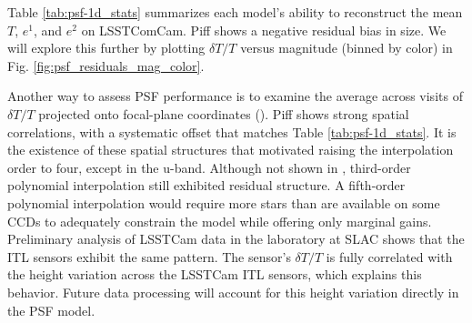 Table \ref{tab:psf-1d_stats} summarizes each model’s ability to reconstruct
the mean $T$, $e^1$, and $e^2$ on  \gls{LSSTComCam}. Piff shows a negative
residual bias in size. We will explore this further by plotting $\delta T/T$
versus magnitude (binned by color) in Fig. \ref{fig:psf_residuals_mag_color}.



Another way to assess \gls{PSF} performance is to examine the average
across visits of $\delta T/T$ projected onto focal-plane coordinates
().
Piff shows strong spatial correlations, with a systematic offset
that matches Table \ref{tab:psf-1d_stats}. It is the existence of these spatial structures that motivated raising the interpolation order to four, except in the u-band.
Although not shown in , third-order polynomial interpolation still exhibited residual structure.
A fifth-order polynomial interpolation would require more stars than are available on some CCDs to adequately constrain the model while offering only marginal gains.
Preliminary analysis of LSSTCam data in the laboratory at \gls{SLAC} shows that the \gls{ITL} sensors exhibit the same pattern.
The sensor's $\delta T/T$ is fully correlated with the height variation across the LSSTCam \gls{ITL} sensors, which explains this behavior.
Future data processing will account for this height variation directly in the \gls{PSF} model.
